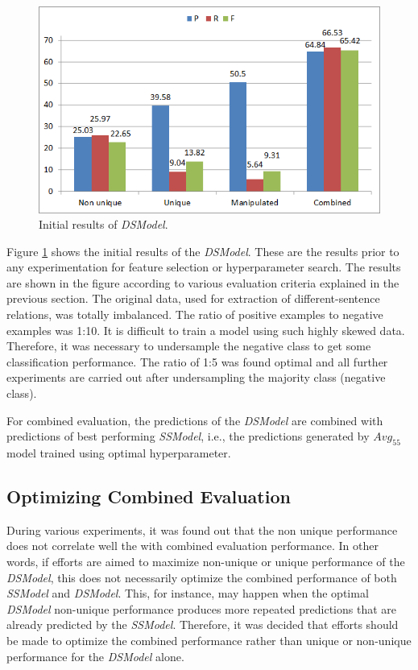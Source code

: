 \begin{figure}
\centering
\includegraphics[scale=0.7]{figures/DSInitialResults.png}
\caption{Initial results of \textit{DSModel}.}\label{fig:DSInitial}
\end{figure}

Figure \ref{fig:DSInitial} shows the initial results of the \textit{DSModel}. These are the results prior to any experimentation for feature selection or hyperparameter search. The results are shown in the figure according to various evaluation criteria explained in the previous section. The original data, used for extraction of different-sentence relations, was totally imbalanced. The ratio of positive examples to negative examples was 1:10. It is difficult to train a model using such highly skewed data. Therefore, it was necessary to undersample \cite{akbani2004applying} the negative class to get some classification performance. The ratio of 1:5 was found optimal and all further experiments are carried out after undersampling the majority class (negative class).

For combined evaluation, the predictions of the \textit{DSModel} are combined with predictions of best performing \textit{SSModel}, i.e., the predictions generated by $Avg_{55}$ model trained using optimal hyperparameter.

\subsection{Optimizing Combined Evaluation}

During various experiments, it was found out that the non unique performance does not correlate well the with combined evaluation performance. In other words, if efforts are aimed to maximize non-unique or unique performance of the \textit{DSModel}, this does not necessarily optimize the combined performance of both \textit{SSModel} and \textit{DSModel}. This, for instance, may happen when the optimal \textit{DSModel} non-unique performance produces more repeated predictions that are already predicted by the \textit{SSModel}. Therefore, it was decided that efforts should be made to optimize the combined performance rather than unique or non-unique performance for the \textit{DSModel} alone.


